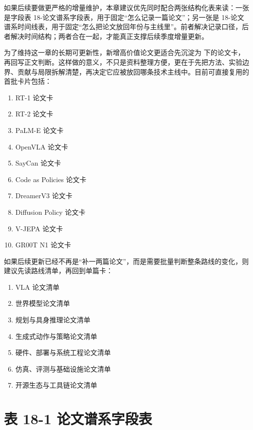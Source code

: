 如果后续要做更严格的增量维护，本章建议优先同时配合两张结构化表来读：一张是字段表 18-论文谱系字段表，用于固定“怎么记录一篇论文”；另一张是 18-论文谱系时间线表，用于固定“怎么把论文放回年份与主线里”。前者解决记录口径，后者解决时间结构；两者合在一起，才能真正支撑后续季度增量更新。

为了维持这一章的长期可更新性，新增高价值论文更适合先沉淀为  下的论文卡，再回写正文判断。这样做的意义，不只是资料整理方便，更在于先把方法、实验边界、贡献与局限拆解清楚，再决定它应被放回哪条技术主线中。目前可直接复用的首批卡片包括：

\begin{enumerate}
\item RT-1 论文卡
\item RT-2 论文卡
\item PaLM-E 论文卡
\item OpenVLA 论文卡
\item SayCan 论文卡
\item Code as Policies 论文卡
\item DreamerV3 论文卡
\item Diffusion Policy 论文卡
\item V-JEPA 论文卡
\item GR00T N1 论文卡
\end{enumerate}

如果后续更新已经不再是“补一两篇论文”，而是需要批量判断整条路线的变化，则建议先读路线清单，再回到单篇卡：

\begin{enumerate}
\item VLA 论文清单
\item 世界模型论文清单
\item 规划与具身推理论文清单
\item 生成式动作与策略论文清单
\item 硬件、部署与系统工程论文清单
\item 仿真、评测与基础设施论文清单
\item 开源生态与工具链论文清单
\end{enumerate}

\section*{表 18-1 论文谱系字段表}

